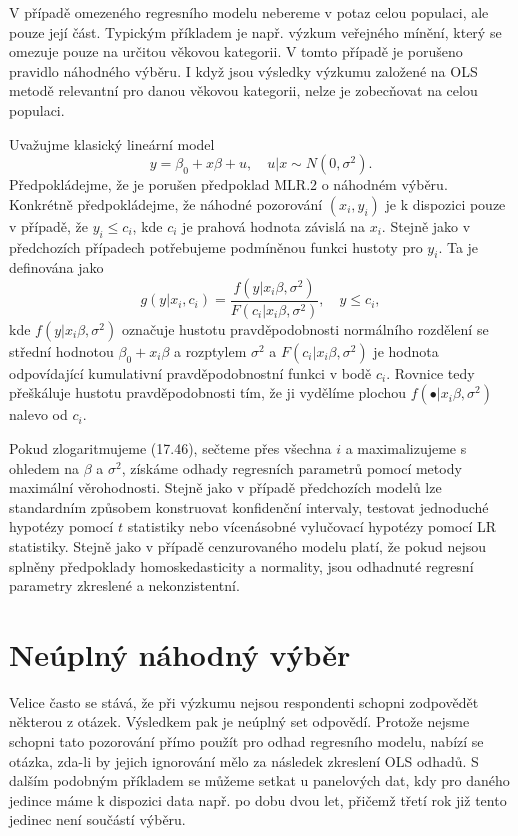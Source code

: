 V případě omezeného regresního modelu nebereme v potaz celou populaci, ale pouze její část. Typickým příkladem je např. výzkum veřejného mínění, který se omezuje pouze na určitou věkovou kategorii. V tomto případě je porušeno pravidlo náhodného výběru. I když jsou výsledky výzkumu založené na OLS metodě relevantní pro danou věkovou kategorii, nelze je zobecňovat na celou populaci.

Uvažujme klasický lineární model
\begin{equation}
y = \beta_0 + x \beta + u, \quad u|x \sim N(0, \sigma^2).
\end{equation}
Předpokládejme, že je porušen předpoklad MLR.2 o náhodném výběru. Konkrétně předpokládejme, že náhodné pozorování $(x_i, y_i)$ je k dispozici pouze v případě, že $y_i \le c_i$, kde $c_i$ je prahová hodnota závislá na $x_i$. Stejně jako v předchozích případech potřebujeme podmíněnou funkci hustoty pro $y_i$. Ta je definována jako
\begin{equation}
g(y|x_i, c_i) = \frac{f(y|x_i \beta, \sigma^2)}{F(c_i | x_i \beta, \sigma^2)}, \quad y \le c_i,
\end{equation}
kde $f(y|x_i \beta, \sigma^2)$ označuje hustotu pravděpodobnosti normálního rozdělení se střední hodnotou $\beta_0 + x_i \beta$ a rozptylem $\sigma^2$ a $F(c_i | x_i \beta, \sigma^2)$ je hodnota odpovídající kumulativní pravděpodobnostní funkci v bodě $c_i$. Rovnice tedy přeškáluje hustotu pravděpodobnosti tím, že ji vydělíme plochou $f(\bullet | x_i \beta, \sigma^2)$ nalevo od $c_i$.

Pokud zlogaritmujeme (17.46), sečteme přes všechna $i$ a maximalizujeme s ohledem na $\beta$ a $\sigma^2$, získáme odhady regresních parametrů pomocí metody maximální věrohodnosti. Stejně jako v případě předchozích modelů lze standardním způsobem konstruovat konfidenční intervaly, testovat jednoduché hypotézy pomocí $t$ statistiky  nebo vícenásobné vylučovací hypotézy pomocí LR statistiky. Stejně jako v případě cenzurovaného modelu platí, že pokud nejsou splněny předpoklady homoskedasticity a normality, jsou odhadnuté regresní parametry zkreslené a nekonzistentní.

\section{Neúplný náhodný výběr}

Velice často se stává, že při výzkumu nejsou respondenti schopni zodpovědět některou z otázek. Výsledkem pak je neúplný set odpovědí. Protože nejsme schopni tato pozorování přímo použít pro odhad regresního modelu, nabízí se otázka, zda-li by jejich ignorování mělo za následek zkreslení OLS odhadů. S dalším podobným příkladem se můžeme setkat u panelových dat, kdy pro daného jedince máme k dispozici data např. po dobu dvou let, přičemž třetí rok již tento jedinec není součástí výběru.

